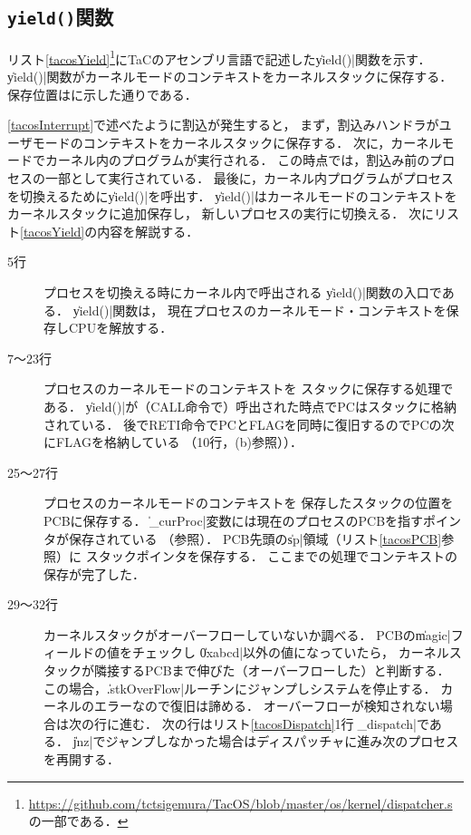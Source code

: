 \subsection{\texttt{yield()}関数}
リスト\ref{tacosYield}\footnote{
  \url{https://github.com/tctsigemura/TacOS/blob/master/os/kernel/dispatcher.s}
  の一部である．
}にTaCのアセンブリ言語で記述した\|yield()|関数を示す．
\|yield()|関数がカーネルモードのコンテキストをカーネルスタックに保存する．
保存位置はに示した通りである．

\ref{tacosInterrupt}で述べたように割込が発生すると，
まず，割込みハンドラがユーザモードのコンテキストをカーネルスタックに保存する．
次に，カーネルモードでカーネル内のプログラムが実行される．
この時点では，割込み前のプロセスの一部として実行されている．
最後に，カーネル内プログラムがプロセスを切換えるために\|yield()|を呼出す．
\|yield()|はカーネルモードのコンテキストをカーネルスタックに追加保存し，
新しいプロセスの実行に切換える．
次にリスト\ref{tacosYield}の内容を解説する．



\begin{description}
\item[5行] プロセスを切換える時にカーネル内で呼出される
  \|yield()|関数の入口である．
  \|yield()|関数は，
  現在プロセスのカーネルモード・コンテキストを保存しCPUを解放する．
\item[7〜23行] プロセスのカーネルモードのコンテキストを
  スタックに保存する処理である．
  \|yield()|が（CALL命令で）呼出された時点でPCはスタックに格納されている．
  後でRETI命令でPCとFLAGを同時に復旧するのでPCの次にFLAGを格納している
  （10行，(b)参照））．
\item[25〜27行] プロセスのカーネルモードのコンテキストを
  保存したスタックの位置をPCBに保存する．
  \|_curProc|変数には現在のプロセスのPCBを指すポインタが保存されている
  （参照）．
  PCB先頭の\|sp|領域（リスト\ref{tacosPCB}参照）に
  スタックポインタを保存する．
  ここまでの処理でコンテキストの保存が完了した．
\item[29〜32行] カーネルスタックがオーバーフローしていないか調べる．
  PCBの\|magic|フィールドの値をチェックし
  \|0xabcd|以外の値になっていたら，
  カーネルスタックが隣接するPCBまで伸びた（オーバーフローした）と判断する．
  この場合，\|.stkOverFlow|ルーチンにジャンプしシステムを停止する．
  カーネルのエラーなので復旧は諦める．
  オーバーフローが検知されない場合は次の行に進む．
  次の行はリスト\ref{tacosDispatch}1行の\|_dispatch|である．
  \|jnz|でジャンプしなかった場合はディスパッチャに進み次のプロセスを再開する．
\end{description}

